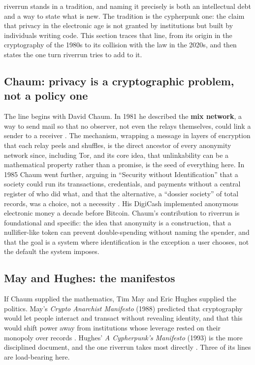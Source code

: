 \documentclass[11pt]{article}
\begin{document}
riverrun stands in a tradition, and naming it precisely is both an intellectual debt and
a way to state what is new. The tradition is the cypherpunk one: the claim that privacy
in the electronic age is not granted by institutions but built by individuals writing
code. This section traces that line, from its origin in the cryptography of the 1980s to
its collision with the law in the 2020s, and then states the one turn riverrun tries to
add to it.

\subsection{Chaum: privacy is a cryptographic problem, not a policy one}

The line begins with David Chaum. In 1981 he described the \textbf{mix network}, a way
to send mail so that no observer, not even the relays themselves, could link a sender to
a receiver \cite{chaum81}. The mechanism, wrapping a message in layers of encryption
that each relay peels and shuffles, is the direct ancestor of every anonymity network
since, including Tor, and its core idea, that unlinkability can be a mathematical
property rather than a promise, is the seed of everything here. In 1985 Chaum went
further, arguing in ``Security without Identification'' that a society could run its
transactions, credentials, and payments without a central register of who did what, and
that the alternative, a ``dossier society'' of total records, was a choice, not a
necessity \cite{chaum85}. His DigiCash implemented anonymous electronic money a decade
before Bitcoin. Chaum's contribution to riverrun is foundational and specific: the idea
that anonymity is a construction, that a nullifier-like token can prevent double-spending
without naming the spender, and that the goal is a system where identification is the
exception a user chooses, not the default the system imposes.

\subsection{May and Hughes: the manifestos}

If Chaum supplied the mathematics, Tim May and Eric Hughes supplied the politics. May's
\emph{Crypto Anarchist Manifesto} (1988) predicted that cryptography would let people
interact and transact without revealing identity, and that this would shift power away
from institutions whose leverage rested on their monopoly over records \cite{may88}.
Hughes' \emph{A Cypherpunk's Manifesto} (1993) is the more disciplined document, and the
one riverrun takes most directly \cite{hughes93}. Three of its lines are load-bearing
here.
\end{document}
